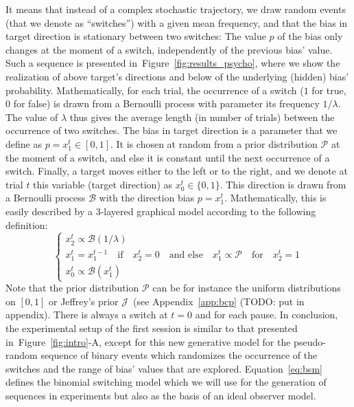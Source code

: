 \documentclass[profile,final,english,draft]{article}%
\newcommand{\choice}[1]{ %
	\left\{ %
		\begin{array}{l} #1 \end{array} %
	\right. }
\newcommand{\eql}[1]{\begin{equation}#1\end{equation}}
\newcommand{\Bb}{\mathcal{B}}
\newcommand{\Jj}{\mathcal{J}}
\newcommand{\Pp}{\mathcal{P}}
\newcommand{\seeFig}[1]{Figure~\ref{fig:#1}}
\newcommand{\seeEq}[1]{Equation~\ref{eq:#1}}
\newcommand{\seeApp}[1]{Appendix~\ref{app:#1}}
\begin{document}
It means that instead of a complex stochastic trajectory,
we draw random events (that we denote as ``switches'')
with a given mean frequency,
and that the bias in target direction is stationary between two switches:
The value $p$ of the bias only changes at the moment of a switch,
independently of the previous bias' value.
Such a sequence is presented in~\seeFig{results_psycho},
where we show the realization of above target's directions and
below of the underlying (hidden) bias' probability.
Mathematically, for each trial,
the occurrence of a switch ($1$ for true, $0$ for false)
is  drawn from a Bernoulli process with parameter its frequency $1/\lambda$.
The value of $\lambda$ thus gives the average length (in number of trials)
between the occurrence of two switches.
The bias in target direction is a parameter that we define as $p=x_1^t \in [0, 1]$.
It is chosen at random from a prior distribution $\Pp$ at the moment of a switch,
and else it is constant until the next occurrence of a switch.
Finally, a target moves either to the left or to the right,
and we denote at trial $t$ this variable (target direction) as $x_0^t\in \{ 0, 1 \}$.
This direction is drawn from a Bernoulli process $\Bb$
with the direction bias $p=x_1^t$.
Mathematically, this is easily described
by a 3-layered graphical model according to %
the following definition:
\eql{\choice{
x_2^t \propto \Bb(1/\lambda) \\
x_1^t = x_1^{t-1} \quad \text{if} \quad x_2^t=0 \quad \text{and else} \quad x_1^t \propto \Pp \quad \text{for} \quad x_2^t=1 \\
x_0^t \propto \Bb(x_1^t)
}\label{eq:bsm}}
Note that the prior distribution $\Pp$ can be for instance
the uniform distributions on $ [ 0, 1 ] $ or
Jeffrey's prior $\Jj$~(see \seeApp{bcp} (TODO: put in appendix).
There is always a switch at $t=0$ and for each pause.
In conclusion, the experimental setup of the first session
is similar to that presented in~\seeFig{intro}-A, except for
this new generative model for the pseudo-random sequence of binary events
which randomizes the occurrence of the switches
and the range of bias' values that are explored.
\seeEq{bsm} defines the binomial switching model which we will use
for the generation of sequences in experiments
but also as the basis of an ideal observer model.
\end{document}
